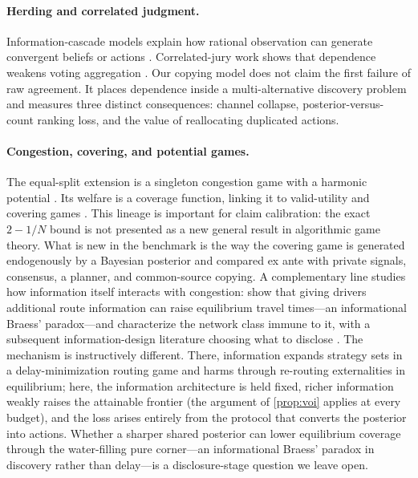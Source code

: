 \documentclass[11pt]{article}
\theoremstyle{definition}
\theoremstyle{remark}
\newcommand{\1}{\mathbf{1}}
\begin{document}
\paragraph{Herding and correlated judgment.}
Information-cascade models explain how rational observation can generate convergent beliefs or actions \citep{Banerjee1992,BikhchandaniEtAl1992,SmithSorensen2000}. Correlated-jury work shows that dependence weakens voting aggregation \citep{Ladha1992}. Our copying model does not claim the first failure of raw agreement. It places dependence inside a multi-alternative discovery problem and measures three distinct consequences: channel collapse, posterior-versus-count ranking loss, and the value of reallocating duplicated actions.

\paragraph{Congestion, covering, and potential games.}
The equal-split extension is a singleton congestion game with a harmonic potential \citep{Rosenthal1973,MondererShapley1996}. Its welfare is a coverage function, linking it to valid-utility and covering games \citep{Vetta2002,Gairing2009}. This lineage is important for claim calibration: the exact $2-1/N$ bound is not presented as a new general result in algorithmic game theory. What is new in the benchmark is the way the covering game is generated endogenously by a Bayesian posterior and compared ex ante with private signals, consensus, a planner, and common-source copying. A complementary line studies how information itself interacts with congestion: \citet{AcemogluEtAl2018} show that giving drivers additional route information can raise equilibrium travel times---an informational Braess' paradox---and characterize the network class immune to it, with a subsequent information-design literature choosing what to disclose \citep{DasKamenicaMirka2017}. The mechanism is instructively different. There, information expands strategy sets in a delay-minimization routing game and harms through re-routing externalities in equilibrium; here, the information architecture is held fixed, richer information weakly raises the attainable frontier (the argument of \cref{prop:voi} applies at every budget), and the loss arises entirely from the protocol that converts the posterior into actions. Whether a sharper shared posterior can lower equilibrium coverage through the water-filling pure corner---an informational Braess' paradox in discovery rather than delay---is a disclosure-stage question we leave open.
\end{document}
